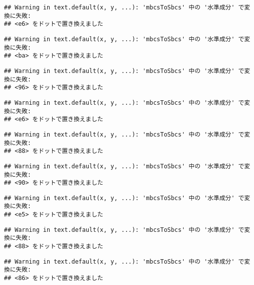 \documentclass[]{article}
\begin{document}
\begin{verbatim}
## Warning in text.default(x, y, ...): 'mbcsToSbcs' 中の '水準成分' で変換に失敗:
## <e6> をドットで置き換えました
\end{verbatim}

\begin{verbatim}
## Warning in text.default(x, y, ...): 'mbcsToSbcs' 中の '水準成分' で変換に失敗:
## <ba> をドットで置き換えました
\end{verbatim}

\begin{verbatim}
## Warning in text.default(x, y, ...): 'mbcsToSbcs' 中の '水準成分' で変換に失敗:
## <96> をドットで置き換えました
\end{verbatim}

\begin{verbatim}
## Warning in text.default(x, y, ...): 'mbcsToSbcs' 中の '水準成分' で変換に失敗:
## <e6> をドットで置き換えました
\end{verbatim}

\begin{verbatim}
## Warning in text.default(x, y, ...): 'mbcsToSbcs' 中の '水準成分' で変換に失敗:
## <88> をドットで置き換えました
\end{verbatim}

\begin{verbatim}
## Warning in text.default(x, y, ...): 'mbcsToSbcs' 中の '水準成分' で変換に失敗:
## <90> をドットで置き換えました
\end{verbatim}

\begin{verbatim}
## Warning in text.default(x, y, ...): 'mbcsToSbcs' 中の '水準成分' で変換に失敗:
## <e5> をドットで置き換えました
\end{verbatim}

\begin{verbatim}
## Warning in text.default(x, y, ...): 'mbcsToSbcs' 中の '水準成分' で変換に失敗:
## <88> をドットで置き換えました
\end{verbatim}

\begin{verbatim}
## Warning in text.default(x, y, ...): 'mbcsToSbcs' 中の '水準成分' で変換に失敗:
## <86> をドットで置き換えました
\end{verbatim}
\end{document}

